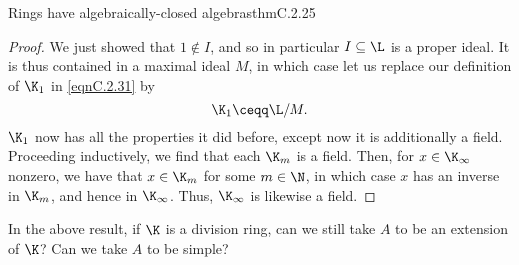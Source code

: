 \begin{thm}{Rings have algebraically-closed algebras}{thmC.2.25}
\begin{proof}
		We just showed that $1\notin I$, and so in particular $I\subseteq \L$ is a proper ideal.  It is thus contained in a maximal ideal $M$, in which case let us replace our definition of $\K _1$ in \eqref{eqnC.2.31} by
		\begin{equation}
			\K _1\ceqq \L /M.
		\end{equation}
		$\K _1$ now has all the properties it did before, except now it is additionally a field.  Proceeding inductively, we find that each $\K _m$ is a field.  Then, for $x\in \K _{\infty}$ nonzero, we have that $x\in \K _m$ for some $m\in \N$, in which case $x$ has an inverse in $\K _m$, and hence in $\K _{\infty}$.  Thus, $\K _{\infty}$ is likewise a field.
	\end{proof}
\end{thm}
\begin{exr}{}{}
	In the above result, if $\K$ is a division ring, can we still take $A$ to be an extension of $\K$?  Can we take $A$ to be simple?
\end{exr}
